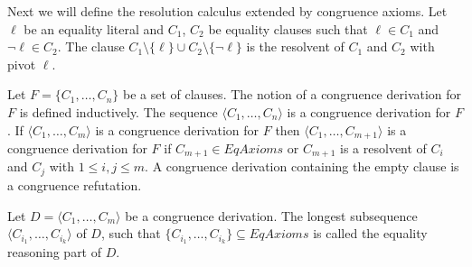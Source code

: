 Next we will define the resolution calculus extended by congruence axioms.
Let $\ell$ be an equality literal and $C_1$, $C_2$ be equality clauses such that $\ell \in C_1$ and $\neg \ell \in C_2$.
The clause $C_1 \setminus \{\ell\} \cup C_2 \setminus \{\neg \ell\}$ is the resolvent of $C_1$ and $C_2$ with pivot $\ell$.

Let $F = \{C_1, \ldots, C_n\}$ be a set of clauses.
The notion of a congruence derivation for $F$ is defined inductively.
The sequence $\langle C_1, \ldots, C_n\rangle$ is a congruence derivation for $F$.
If $\langle C_1, \ldots, C_m\rangle$ is a congruence derivation for $F$ then $\langle C_1, \ldots, C_{m+1} \rangle$ is a congruence derivation for $F$ if $C_{m+1} \in EqAxioms$ or $C_{m+1}$ is a resolvent of $C_i$ and $C_j$ with $1 \leq i,j \leq m$.
A congruence derivation containing the empty clause is a congruence refutation.

Let $D = \langle C_1, \ldots, C_m\rangle$ be a congruence derivation.
The longest subsequence $\langle C_{i_1}, \ldots, C_{i_k}\rangle$ of $D$, such that $\{C_{i_1}, \ldots, C_{i_k}\} \subseteq EqAxioms$ is called the equality reasoning part of $D$.

